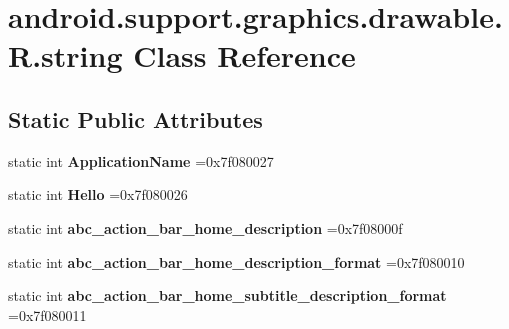 \hypertarget{classandroid_1_1support_1_1graphics_1_1drawable_1_1R_1_1string}{}\section{android.\+support.\+graphics.\+drawable.\+R.\+string Class Reference}
\label{classandroid_1_1support_1_1graphics_1_1drawable_1_1R_1_1string}
\subsection*{Static Public Attributes}
\begin{DoxyCompactItemize}
\item 
\mbox{\label{classandroid_1_1support_1_1graphics_1_1drawable_1_1R_1_1string_a1419751bbab6bd43dfdc64bfb2ceeae7}} 
static int {\bfseries Application\+Name} =0x7f080027
\item 
\mbox{\label{classandroid_1_1support_1_1graphics_1_1drawable_1_1R_1_1string_a19d4ab33c6d674b4e3268838129c1bf9}} 
static int {\bfseries Hello} =0x7f080026
\item 
\mbox{\label{classandroid_1_1support_1_1graphics_1_1drawable_1_1R_1_1string_a08df8bc3d455269eab404b43a764b5c0}} 
static int {\bfseries abc\+\_\+action\+\_\+bar\+\_\+home\+\_\+description} =0x7f08000f
\item 
\mbox{\label{classandroid_1_1support_1_1graphics_1_1drawable_1_1R_1_1string_a8349984f20b404ec64db3b30479d17b5}} 
static int {\bfseries abc\+\_\+action\+\_\+bar\+\_\+home\+\_\+description\+\_\+format} =0x7f080010
\item 
\mbox{\label{classandroid_1_1support_1_1graphics_1_1drawable_1_1R_1_1string_a9f9677bb4cc693e2be5ad114cca70069}} 
static int {\bfseries abc\+\_\+action\+\_\+bar\+\_\+home\+\_\+subtitle\+\_\+description\+\_\+format} =0x7f080011
\item 
\mbox{\label{classandroid_1_1support_1_1graphics_1_1drawable_1_1R_1_1string_a5cf82f4d12a9b9f4996d5f297f78c4cb}} 

\end{DoxyCompactItemize}
